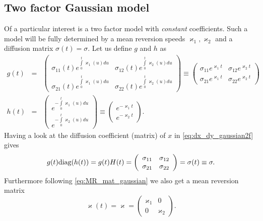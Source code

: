 \documentclass[11pt,a4paper]{article}
\numberwithin{equation}{section}
\begin{document}
\subsection{Two factor Gaussian model}
Of a particular interest is a two factor model with \textit{constant} coefficients. Such a model will be fully determined by a mean reversion speeds $\varkappa_1, \varkappa_2$ and a diffusion matrix $\sigma(t)=\sigma$. Let us define $g$ and $h$ as
\begin{eqnarray*}
g(t) &=& \left( {\begin{array}{*{20}{c}}
{{\sigma _{11}}(t){e^{\int\limits_0^t {{\varkappa _1}(u)du} }}}&{{\sigma _{12}}(t){e^{\int\limits_0^t {{\varkappa _2}(u)du} }}}\\
{{\sigma _{21}}(t){e^{\int\limits_0^t {{\varkappa _1}(u)du} }}}&{{\sigma _{22}}(t){e^{\int\limits_0^t {{\varkappa _2}(u)du} }}}
\end{array}} \right) \equiv \left( {\begin{array}{*{20}{c}}
{{\sigma _{11}}{e^{{\varkappa _1}t}}}&{{\sigma _{12}}{e^{{\varkappa _2}t}}}\\
{{\sigma _{21}}{e^{{\varkappa _1}t}}}&{{\sigma _{22}}{e^{{\varkappa _2}t}}}
\end{array}} \right)\\
h(t) &=& \left( {\begin{array}{*{20}{c}}
{{e^{ - \int\limits_0^t {{\varkappa _1}(u)du} }}}\\
{{e^{ - \int\limits_0^t {{\varkappa _2}(u)du} }}}
\end{array}} \right) \equiv \left( {\begin{array}{*{20}{c}}
{{e^{ - {\varkappa _1}t}}}\\
{{e^{ - {\varkappa _2}t}}}
\end{array}} \right).
\end{eqnarray*}
Having a look at the diffusion coefficient (matrix) of $x$ in \eqref{eq:dx_dy_gaussian2f} gives
\begin{equation*}
  g(t){\rm{diag(}}h(t)) = g(t)H(t) = \left( {\begin{array}{*{20}{c}}
{{\sigma _{11}}}&{{\sigma _{12}}}\\
{{\sigma _{21}}}&{{\sigma _{22}}}
\end{array}} \right) = \sigma (t) \equiv \sigma.
\end{equation*}
Furthermore following \eqref{eq:MR_mat_gaussian} we also get a mean reversion matrix
\begin{equation*}
  \varkappa (t) = \varkappa  = \left( {\begin{array}{*{20}{c}}
{{\varkappa _1}}&0\\
0&{{\varkappa _2}}
\end{array}} \right).
\end{equation*}
\end{document}
